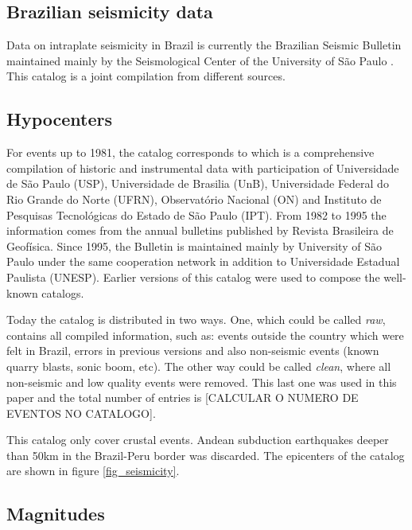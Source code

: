\documentclass[draft, grl]{agutex}
\begin{document}
\begin{article}
\section{Brazilian seismicity data}

Data on intraplate seismicity in Brazil is currently the Brazilian Seismic Bulletin maintained mainly by the Seismological Center of the University of São Paulo \citep{bsb_2014}. This catalog is a joint compilation from different sources.


\subsection{Hypocenters}

For events up to 1981, the catalog corresponds to \citet{berrocal_1984} which is a comprehensive compilation of historic and instrumental data with participation of Universidade de São Paulo (USP), Universidade de Brasilia (UnB), Universidade Federal do Rio Grande do Norte (UFRN), Observatório Nacional (ON) and Instituto de Pesquisas Tecnológicas do Estado de São Paulo (IPT). From 1982 to 1995 the information comes from the annual bulletins published by Revista Brasileira de Geofísica. Since 1995, the Bulletin is maintained mainly by University of São Paulo under the same cooperation network in addition to Universidade Estadual Paulista (UNESP). Earlier versions of this catalog were used to compose the well-known \citet{ceresis_1985, ceresis_1995} catalogs.

Today the catalog is distributed in two ways. One, which could be called \emph{raw}, contains all compiled information, such as: events outside the country which were felt in Brazil, errors in previous versions and also non-seismic events (known quarry blasts, sonic boom, etc). The other way could be called \emph{clean}, where all non-seismic and low quality events were removed. This last one was used in this paper and the total number of entries is [CALCULAR O NUMERO DE EVENTOS NO CATALOGO].

This catalog only cover crustal events. Andean subduction earthquakes deeper than 50km in the Brazil-Peru border was discarded. The epicenters of the catalog are shown in figure \ref{fig_seismicity}.



\subsection{Magnitudes}


\end{article}
\end{document}
